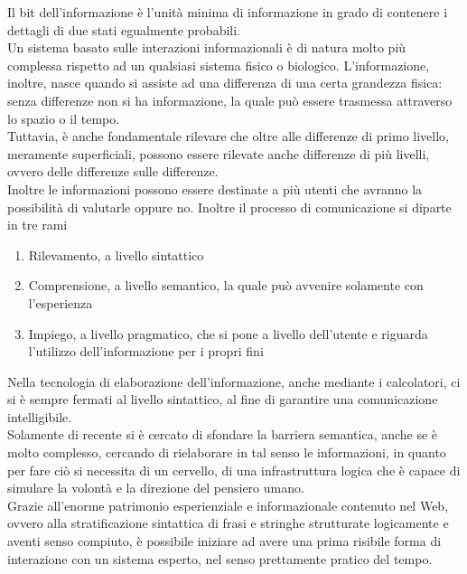 \documentclass[a4paper]{extarticle}
\begin{document}
\vspace{1em}
\noindent
Il bit dell'informazione è l'unità minima di informazione in grado di contenere i dettagli di due stati egualmente probabili.\\
Un sistema basato sulle interazioni informazionali è di natura molto più complessa rispetto ad un qualsiasi sistema fisico o biologico. L'informazione, inoltre, nasce quando si assiste ad una differenza di una certa grandezza fisica: senza differenze non si ha informazione, la quale può essere trasmessa attraverso lo spazio o il tempo.\\
Tuttavia, è anche fondamentale rilevare che oltre alle differenze di primo livello, meramente superficiali, possono essere rilevate anche differenze di più livelli, ovvero delle differenze sulle differenze.\\
Inoltre le informazioni possono essere destinate a più utenti che avranno la possibilità di valutarle oppure no. Inoltre il processo di comunicazione si diparte in tre rami
\begin{enumerate}
    \item Rilevamento, a livello sintattico
    \item Comprensione, a livello semantico, la quale può avvenire solamente con l'esperienza
    \item Impiego, a livello pragmatico, che si pone a livello dell'utente e riguarda l'utilizzo dell'informazione per i propri fini
\end{enumerate}
Nella tecnologia di elaborazione dell'informazione, anche mediante i calcolatori, ci si è sempre fermati al livello sintattico, al fine di garantire una comunicazione intelligibile.\\
Solamente di recente si è cercato di sfondare la barriera semantica, anche se è molto complesso, cercando di rielaborare in tal senso le informazioni, in quanto per fare ciò si necessita di un cervello, di una infrastruttura logica che è capace di simulare la volontà e la direzione del pensiero umano.\\
Grazie all'enorme patrimonio esperienziale e informazionale contenuto nel Web, ovvero alla stratificazione sintattica di frasi e stringhe strutturate logicamente e aventi senso compiuto, è possibile iniziare ad avere una prima risibile forma di interazione con un sistema esperto, nel senso prettamente pratico del tempo.

\vspace{1em}
\end{document}
